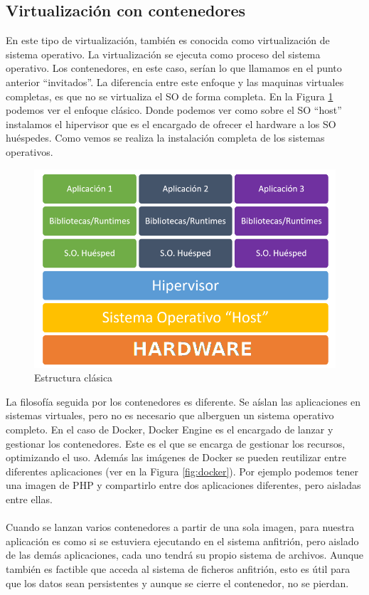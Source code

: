 \documentclass[11pt,a4paper]{article}
\begin{document}
\subsection{Virtualización con contenedores}
En este tipo de virtualización, también es conocida como virtualización de sistema operativo. La virtualización  se ejecuta como proceso del sistema operativo. Los contenedores, en este caso, serían lo que llamamos en el punto anterior ``invitados''. La diferencia entre este enfoque y las maquinas virtuales completas, es que no se virtualiza el SO de forma completa. En la Figura \ref{fig:hypervisor} podemos ver el enfoque clásico. Donde podemos ver como sobre el SO ``host'' instalamos el hipervisor que es el encargado de ofrecer el hardware a los SO huéspedes. Como vemos se realiza la instalación completa de los sistemas operativos. 
 \begin{figure}[H]
	\centering
	\includegraphics[scale=0.5]{images/estructura_hypervisor.png}
	\caption[Estructura clásica]{Estructura clásica}
	\label{fig:hypervisor}
\end{figure}
La filosofía seguida por los contenedores es diferente.  Se aíslan las aplicaciones en sistemas virtuales, pero no es necesario que alberguen un sistema operativo completo. En el caso de Docker, Docker Engine es el encargado de lanzar y gestionar los contenedores. Este es el que se encarga de gestionar los recursos, optimizando el uso. Además las imágenes de Docker se pueden reutilizar entre diferentes aplicaciones (ver en la Figura \ref{fig:docker}). Por ejemplo podemos tener una imagen de PHP y compartirlo entre dos aplicaciones diferentes, pero aisladas entre ellas.\\\\
Cuando se lanzan varios contenedores a partir de una sola imagen, para nuestra aplicación es como si se estuviera ejecutando en el sistema anfitrión, pero aislado de las demás aplicaciones, cada uno tendrá su propio sistema de archivos. Aunque también es factible que acceda al sistema de ficheros anfitrión, esto es útil para que los datos sean persistentes y aunque se cierre el contenedor, no se pierdan.
\end{document}
